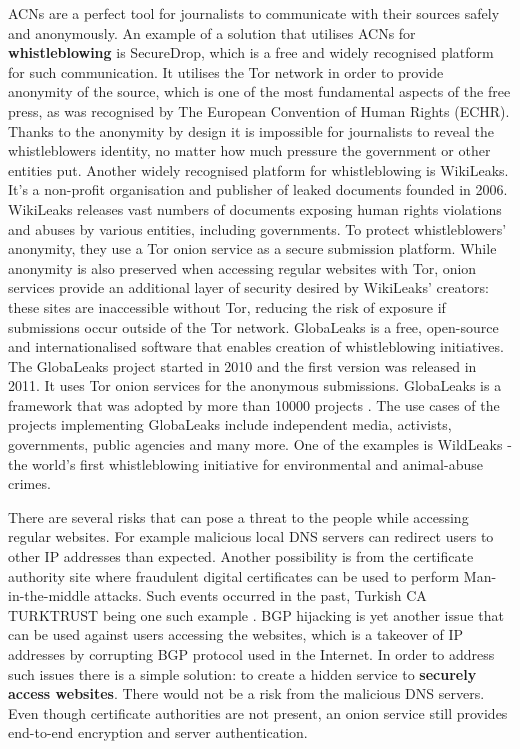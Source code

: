 ACNs are a perfect tool for journalists to communicate with their sources safely and anonymously. An example of a solution that utilises ACNs for \textbf{whistleblowing} is SecureDrop, which is a free and widely recognised platform for such communication. It utilises the Tor network in order to provide anonymity of the source, which is one of the most fundamental aspects of the free press, as was recognised by The European Convention of Human Rights (ECHR). Thanks to the anonymity by design it is impossible for journalists to reveal the whistleblowers identity, no matter how much pressure the government or other entities put.
Another widely recognised platform for whistleblowing is WikiLeaks. It’s a non-profit organisation and publisher of leaked documents founded in 2006. WikiLeaks releases vast numbers of documents exposing human rights violations and abuses by various entities, including governments. To protect whistleblowers’ anonymity, they use a Tor onion service as a secure submission platform. While anonymity is also preserved when accessing regular websites with Tor, onion services provide an additional layer of security desired by WikiLeaks’ creators: these sites are inaccessible without Tor, reducing the risk of exposure if submissions occur outside of the Tor network.
GlobaLeaks is a free, open-source and internationalised software that enables creation of whistleblowing initiatives. The GlobaLeaks project started in 2010 and the first version was released in 2011. It uses Tor onion services for the anonymous submissions. GlobaLeaks is a framework that was adopted by more than 10000 projects \cite{globaleaks}. The use cases of the projects implementing GlobaLeaks include independent media, activists, governments, public agencies and many more. One of the examples is WildLeaks \cite{wildleaks} - the world’s first whistleblowing initiative for environmental and animal-abuse crimes.

There are several risks that can pose a threat to the people while accessing regular websites. For example malicious local DNS servers can redirect users to other IP addresses than expected. Another possibility is from the certificate authority site where fraudulent digital certificates can be used to perform Man-in-the-middle attacks. Such events occurred in the past, Turkish CA TURKTRUST being one such example \cite{turkish-ca}. BGP hijacking is yet another issue that can be used against users accessing the websites, which is a takeover of IP addresses by corrupting BGP protocol used in the Internet. 
In order to address such issues there is a simple solution: to create a hidden service to \textbf{securely access websites}. There would not be a risk from the malicious DNS servers. Even though certificate authorities are not present, an onion service still provides end-to-end encryption and server authentication.


